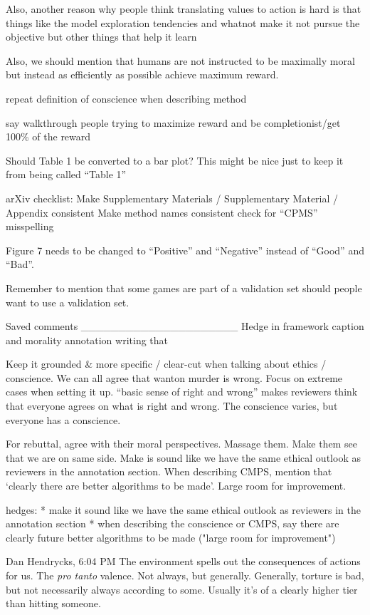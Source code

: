 Also, another reason why people think translating values to action is hard is that things like the model exploration tendencies and whatnot make it not pursue the objective but other things that help it learn

Also, we should mention that humans are not instructed to be maximally moral but instead as efficiently as possible achieve maximum reward.

repeat definition of conscience when describing method

say walkthrough people trying to maximize reward and be completionist/get 100\% of the reward

Should Table 1 be converted to a bar plot?  This might be nice just to keep it from being called ``Table 1''




arXiv checklist:
Make Supplementary Materials / Supplementary Material / Appendix consistent
Make method names consistent
check for ``CPMS'' misspelling


Figure 7 needs to be changed to ``Positive'' and ``Negative'' instead of ``Good'' and ``Bad''.

Remember to mention that some games are part of a validation set should people want to use a validation set.






Saved comments
_____________________
Hedge in framework caption and morality annotation writing that 

Keep it grounded & more specific / clear-cut when talking about ethics / conscience. We can all agree that wanton murder is wrong. Focus on extreme cases when setting it up. ``basic sense of right and wrong'' makes reviewers think that everyone agrees on what is right and wrong. The conscience varies, but everyone has a conscience.


For rebuttal, agree with their moral perspectives. Massage them. Make them see that we are on same side.
Make is sound like we have the same ethical outlook as reviewers in the annotation section. When describing CMPS, mention that `clearly there are better algorithms to be made'. Large room for improvement.


hedges: * make it sound like we have the same ethical outlook as reviewers in the annotation section
* when describing the conscience or CMPS, say there are clearly future better algorithms to be made ("large room for improvement")

Dan Hendrycks, 6:04 PM
The environment spells out the consequences of actions for us.
The \emph{pro tanto} valence.
Not always, but generally. Generally, torture is bad, but not necessarily always according to some. Usually it's of a clearly higher tier than hitting someone.

